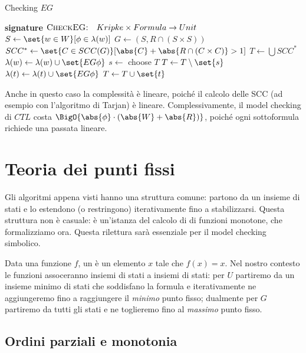 \begin{algorithmdesc}{Checking \(EG\)}
  \begin{algorithmic}[1]
    \Statex{} \textbf{signature} \(\textsc{CheckEG:} \quad Kripke \times Formula \to Unit\)
    \State{} \(S \gets \set{w \in W}[\phi \in \lambda(w)]\)
    \State{} \(G \gets (S, R\cap(S\times S))\)
    \State{} \(SCC^* \gets \set{C \in SCC(G)}[\abs{C} + \abs{R\cap(C\times C)} > 1]\)
    \State{} \(T \gets \bigcup SCC^*\)
    \State{} \(\lambda(w) \gets \lambda(w)\cup\set{E G \phi}\)
    \EndFor{}
    \State{} \(s \gets\) choose \(T\)
    \State{} \(T \gets T\setminus\set{s}\)
    \State{} \(\lambda(t) \gets \lambda(t)\cup\set{E G \phi}\)
    \State{} \(T \gets T\cup\set{t}\)
    \EndIf{}
    \EndFor{}
    \EndWhile{}
    \EndFunction{}
  \end{algorithmic}
\end{algorithmdesc}

Anche in questo caso la complessità è lineare, poiché il calcolo delle SCC (ad esempio con l'algoritmo di Tarjan) è lineare. Complessivamente, il model checking di \(CTL\) costa \(\BigO{\abs{\phi}\cdot(\abs{W} + \abs{R})}\), poiché ogni sottoformula richiede una passata lineare.

\section{Teoria dei punti fissi}

Gli algoritmi appena visti hanno una struttura comune: partono da un insieme di stati e lo estendono (o restringono) iterativamente fino a stabilizzarsi. Questa struttura non è casuale: è un'istanza del calcolo di  di funzioni monotone, che formalizziamo ora. Questa rilettura sarà essenziale per il model checking simbolico.

Data una funzione \(f\), un  è un elemento \(x\) tale che \(f(x) = x\). Nel nostro contesto le funzioni assoceranno insiemi di stati a insiemi di stati: per \(U\) partiremo da un insieme minimo di stati che soddisfano la formula e iterativamente ne aggiungeremo fino a raggiungere il \emph{minimo} punto fisso; dualmente per \(G\) partiremo da tutti gli stati e ne toglieremo fino al \emph{massimo} punto fisso.

\subsection{Ordini parziali e monotonia}

